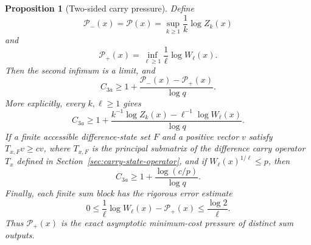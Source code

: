 \documentclass[11pt]{article}
\newtheorem{proposition}{Proposition}
\begin{document}
\begin{proposition}[Two-sided carry pressure]\label{prop:two-pressure}
Define
\[
 \mathcal P_-(x)=\mathcal P(x)
 =\sup_{k\ge1}\frac1k\log Z_k(x)
\]
and
\[
 \mathcal P_+(x)=\inf_{\ell\ge1}\frac1\ell\log W_\ell(x).
\]
Then the second infimum is a limit, and
\begin{equation}\label{eq:ultimate-bound}
 C_{3a}\ge
 1+\frac{\mathcal P_-(x)-\mathcal P_+(x)}{\log q}.
\end{equation}
More explicitly, every $k,\ell\ge1$ gives
\begin{equation}\label{eq:finite-two-block-bound}
 C_{3a}\ge1+
 \frac{k^{-1}\log Z_k(x)-\ell^{-1}\log W_\ell(x)}{\log q}.
\end{equation}
If a finite accessible difference-state set $F$ and a positive vector $v$
satisfy $T_{x,F}v\ge cv$, where $T_{x,F}$ is the principal submatrix of the
difference carry operator $T_x$ defined in
Section~\ref{sec:carry-state-operator}, and if
$W_\ell(x)^{1/\ell}\le p$, then
\begin{equation}\label{eq:finite-two-pressure-certificate}
 C_{3a}\ge1+\frac{\log(c/p)}{\log q}.
\end{equation}
Finally, each finite sum block has the rigorous error estimate
\begin{equation}\label{eq:sum-pressure-error}
 0\le \frac1\ell\log W_\ell(x)-\mathcal P_+(x)
 \le\frac{\log2}{\ell}.
\end{equation}
Thus $\mathcal P_+(x)$ is the exact asymptotic minimum-cost pressure of
distinct sum outputs.
\end{proposition}
\end{document}
